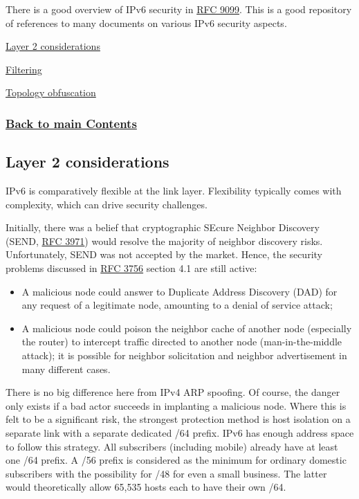 \documentclass[
]{article}
\providecommand{\tightlist}{%
  \setlength{\itemsep}{0pt}\setlength{\parskip}{0pt}}
\begin{document}
There is a good overview of IPv6 security in
\href{https://www.rfc-editor.org/info/rfc9099}{RFC 9099}. This is a good
repository of references to many documents on various IPv6 security
aspects.

\hyperref[layer-2-considerations]{Layer 2 considerations}

\hyperref[filtering]{Filtering}

\hyperref[topology-obfuscation]{Topology obfuscation}

\subsubsection{\texorpdfstring{\hyperref[list-of-contents]{Back to main
Contents}}{Back to main Contents}}\label{back-to-main-contents-3}

\pagebreak

\subsection{Layer 2 considerations}\label{layer-2-considerations}

IPv6 is comparatively flexible at the link layer. Flexibility typically
comes with complexity, which can drive security challenges.

Initially, there was a belief that cryptographic SEcure Neighbor
Discovery (SEND, \href{https://www.rfc-editor.org/info/rfc3971}{RFC
3971}) would resolve the majority of neighbor discovery risks.
Unfortunately, SEND was not accepted by the market. Hence, the security
problems discussed in \href{https://www.rfc-editor.org/info/rfc3756}{RFC
3756} section 4.1 are still active:

\begin{itemize}
\tightlist
\item
  A malicious node could answer to Duplicate Address Discovery (DAD) for
  any request of a legitimate node, amounting to a denial of service
  attack;
\item
  A malicious node could poison the neighbor cache of another node
  (especially the router) to intercept traffic directed to another node
  (man-in-the-middle attack); it is possible for neighbor solicitation
  and neighbor advertisement in many different cases.
\end{itemize}

There is no big difference here from IPv4 ARP spoofing. Of course, the
danger only exists if a bad actor succeeds in implanting a malicious
node. Where this is felt to be a significant risk, the strongest
protection method is host isolation on a separate link with a separate
dedicated /64 prefix. IPv6 has enough address space to follow this
strategy. All subscribers (including mobile) already have at least one
/64 prefix. A /56 prefix is considered as the minimum for ordinary
domestic subscribers with the possibility for /48 for even a small
business. The latter would theoretically allow 65,535 hosts each to have
their own /64.
\end{document}
